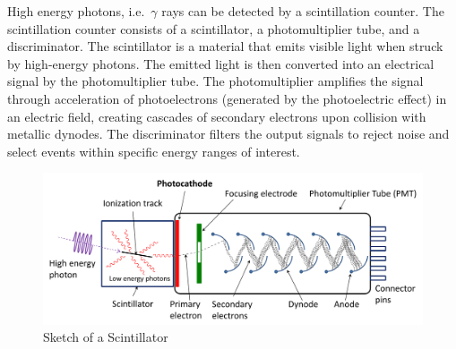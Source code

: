 \documentclass[
  a4paper,
]{book}
\begin{document}
\begin{tcolorbox}[enhanced jigsaw, coltitle=black, title=\textcolor{quarto-callout-note-color}{\faInfo}\hspace{0.5em}{Detection of \(\gamma\) rays}, colframe=quarto-callout-note-color-frame, toprule=.15mm, opacitybacktitle=0.6, left=2mm, opacityback=0, breakable, toptitle=1mm, bottomtitle=1mm, leftrule=.75mm, arc=.35mm, titlerule=0mm, colbacktitle=quarto-callout-note-color!10!white, rightrule=.15mm, bottomrule=.15mm, colback=white]

High energy photons, i.e.~\(\gamma\) rays can be detected by a
scintillation counter. The scintillation counter consists of a
scintillator, a photomultiplier tube, and a discriminator. The
scintillator is a material that emits visible light when struck by
high-energy photons. The emitted light is then converted into an
electrical signal by the photomultiplier tube. The photomultiplier
amplifies the signal through acceleration of photoelectrons (generated
by the photoelectric effect) in an electric field, creating cascades of
secondary electrons upon collision with metallic dynodes. The
discriminator filters the output signals to reject noise and select
events within specific energy ranges of interest.

\begin{figure}[H]

{\centering \includegraphics[width=0.7\linewidth,height=\textheight,keepaspectratio]{quantum-mechanics/img/scintillator.png}

}

\caption{Sketch of a Scintillator}

\end{figure}%

\end{tcolorbox}
\end{document}
